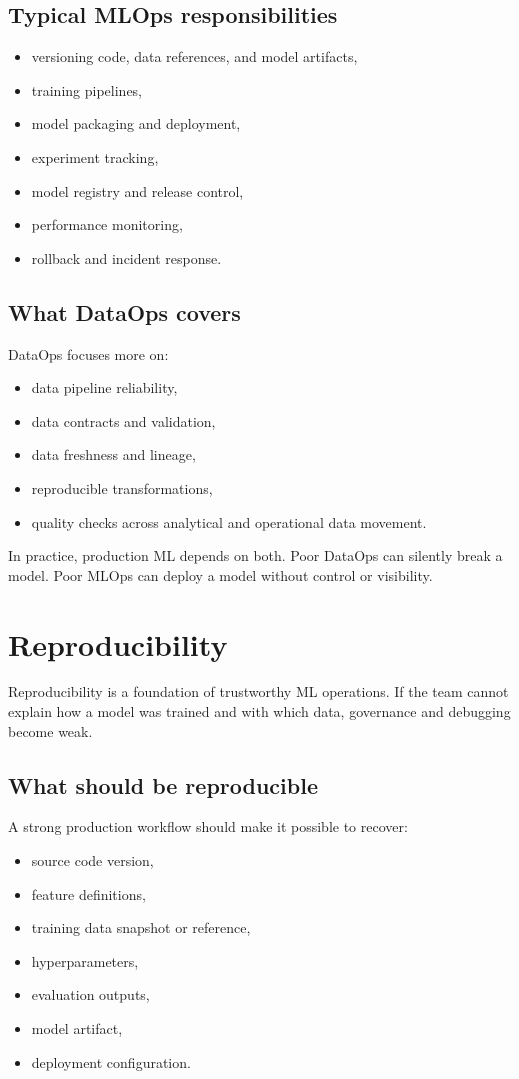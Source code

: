 \subsection{Typical MLOps responsibilities}
\begin{itemize}
  \item versioning code, data references, and model artifacts,
  \item training pipelines,
  \item model packaging and deployment,
  \item experiment tracking,
  \item model registry and release control,
  \item performance monitoring,
  \item rollback and incident response.
\end{itemize}

\subsection{What DataOps covers}
DataOps focuses more on:
\begin{itemize}
  \item data pipeline reliability,
  \item data contracts and validation,
  \item data freshness and lineage,
  \item reproducible transformations,
  \item quality checks across analytical and operational data movement.
\end{itemize}

In practice, production ML depends on both.
Poor DataOps can silently break a model.
Poor MLOps can deploy a model without control or visibility.

\section{Reproducibility}
Reproducibility is a foundation of trustworthy ML operations.
If the team cannot explain how a model was trained and with which data, governance and debugging become weak.

\subsection{What should be reproducible}
A strong production workflow should make it possible to recover:
\begin{itemize}
  \item source code version,
  \item feature definitions,
  \item training data snapshot or reference,
  \item hyperparameters,
  \item evaluation outputs,
  \item model artifact,
  \item deployment configuration.
\end{itemize}

